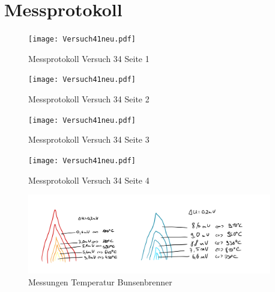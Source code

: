 \section{Messprotokoll}
\begin{figure}[h!]
    \centering
    \texttt{[image: Versuch41neu.pdf]}
    \caption{Messprotokoll Versuch 34 Seite 1}
\end{figure}
\newpage
\begin{figure}[h!]
    \centering
    \texttt{[image: Versuch41neu.pdf]}
    \caption{Messprotokoll Versuch 34 Seite 2}
\end{figure}
\newpage
\begin{figure}[h!]
    \centering
    \texttt{[image: Versuch41neu.pdf]}
    \caption{Messprotokoll Versuch 34  Seite 3}
\end{figure}
\newpage
\begin{figure}[h!]
    \centering
    \texttt{[image: Versuch41neu.pdf]}
    \caption{Messprotokoll Versuch 34 Seite 4}
\end{figure}
\begin{figure}[h!]
    \centering
    \includegraphics[width=0.95\textwidth]{41Flamen.jpeg}
    \caption{Messungen Temperatur Bunsenbrenner}
\end{figure}
\clearpage
\newpage
\mbox{~}
\clearpage
\newpage